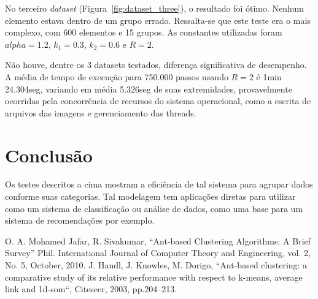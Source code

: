 \documentclass[conference]{IEEEtran}
\begin{document}
No terceiro \textit{dataset} (Figura~\ref{fig:dataset_three}), o resultado foi ótimo. Nenhum elemento estava dentro de um grupo errado. Ressalta-se que este teste era o mais complexo, com 600 elementos e 15 grupos.
As constantes utilizadas foram $alpha=1.2$, $k_1 = 0.3$, $k_2 = 0.6$ e $R=2$.

Não houve, dentre os 3 datasets testados, diferença significativa de desempenho. A média de tempo de execução para 750.000 passos usando $R=2$ é 1min 24.304seg, variando em média 5.326seg de suas extremidades, provavelmente ocorridas pela concorrência de recursos do sistema operacional, como a escrita de arquivos das imagens e gerenciamento das threads.

\section{Conclusão}

Os testes descritos a cima mostram a eficiência de tal sistema para agrupar dados conforme suas categorias. Tal modelagem tem aplicações diretas para utilizar como um sistema de classificação ou análise de dados, como uma base para um sistema de recomendações por exemplo.


\begin{thebibliography}{00}
 O. A. Mohamed Jafar, R. Sivakumar, ``Ant-based Clustering Algorithms: A Brief 
Survey'' Phil. International Journal of Computer Theory and Engineering, vol. 2, No. 5, October, 2010.
 J. Handl, J. Knowles, M. Dorigo, ``Ant-based clustering: a comparative study of its relative performance with respect to k-means, average link and 1d-som``, Citeseer, 2003, pp.204--213.
\end{thebibliography}
\end{document}
